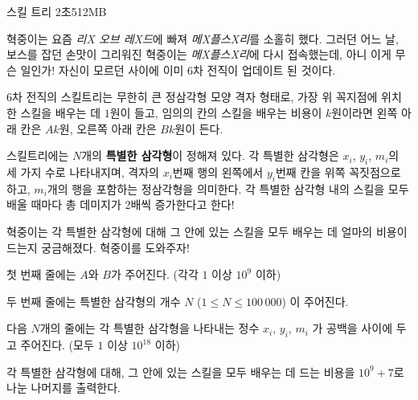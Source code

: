 \begin{problem}{스킬 트리}
{}{}
{2초}{512MB}{}

혁중이는 요즘 \textit{리X 오브 레X드}에 빠져 \textit{메X플스X리}를 소홀히 했다. 그러던 어느 날, 보스를 잡던 손맛이 그리워진 혁중이는 \textit{메X플스X리}에 다시 접속했는데, 아니 이게 무슨 일인가! 자신이 모르던 사이에 이미 6차 전직이 업데이트 된 것이다.

6차 전직의 스킬트리는 무한히 큰 정삼각형 모양 격자 형태로, 가장 위 꼭지점에 위치한 스킬을 배우는 데 $1$원이 들고, 임의의 칸의 스킬을 배우는 비용이 $k$원이라면 왼쪽 아래 칸은 $Ak$원, 오른쪽 아래 칸은 $Bk$원이 든다.

스킬트리에는 $N$개의 \textbf{특별한 삼각형}이 정해져 있다. 각 특별한 삼각형은 $x_i$, $y_i$, $m_i$의 세 가지 수로 나타내지며, 격자의 $x_i$번째 행의 왼쪽에서 $y_i$번째 칸을 위쪽 꼭짓점으로 하고, $m_i$개의 행을 포함하는 정삼각형을 의미한다. 각 특별한 삼각형 내의 스킬을 모두 배울 때마다 총 데미지가 2배씩 증가한다고 한다!

혁중이는 각 특별한 삼각형에 대해 그 안에 있는 스킬을 모두 배우는 데 얼마의 비용이 드는지 궁금해졌다. 혁중이를 도와주자!

\InputFile

첫 번째 줄에는 $A$와 $B$가 주어진다. (각각 $1$ 이상 $10^{9}$ 이하)

두 번째 줄에는 특별한 삼각형의 개수 $N$ ($1 \le N \le 100\, 000$) 이 주어진다.

다음 $N$개의 줄에는 각 특별한 삼각형을 나타내는 정수 $x_i$, $y_i$, $m_i$ 가 공백을 사이에 두고 주어진다. (모두 $1$ 이상 $10^{18}$ 이하)

\OutputFile

각 특별한 삼각형에 대해, 그 안에 있는 스킬을 모두 배우는 데 드는 비용을 $10^9+7$로 나눈 나머지를 출력한다.

\Examples
	
\begin{example}
%
\end{example}

\blankpage

\end{problem}
